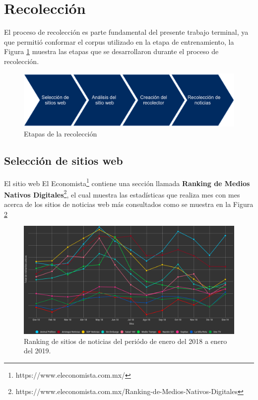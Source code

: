 \section{Recolección}


El proceso de recolección es parte fundamental del presente trabajo terminal, ya que permitió conformar el corpus utilizado en la etapa de entrenamiento, la Figura \ref{fig:etapRecoleccion} muestra las etapas que se desarrollaron durante el proceso de recolección.\\

\begin{figure}[H]
	\centering
	\includegraphics[scale=.30]{imagenes/Capitulo5/etapasRecoleccion.png}
	\caption{Etapas de la recolección}
	\label{fig:etapRecoleccion}
\end{figure}

\subsection{Selección de sitios web}

El sitio web El Economista\footnote{https://www.eleconomista.com.mx/} contiene una sección llamada 
\textbf{Ranking de Medios Nativos Digitales}\footnote{https://www.eleconomista.com.mx/Ranking-de-Medios-Nativos-Digitales}, el cual muestra las estadísticas que realiza mes con mes acerca de los sitios de noticias web más consultados como se muestra en la Figura \ref{fig:rank}\\

\begin{figure}[H]
  \centering
  \includegraphics[scale=.32]{imagenes/Capitulo5/ranking.png}
  \caption{Ranking de sitios de noticias del periódo de enero del 2018 a enero del 2019.}
  \label{fig:rank}
\end{figure}

